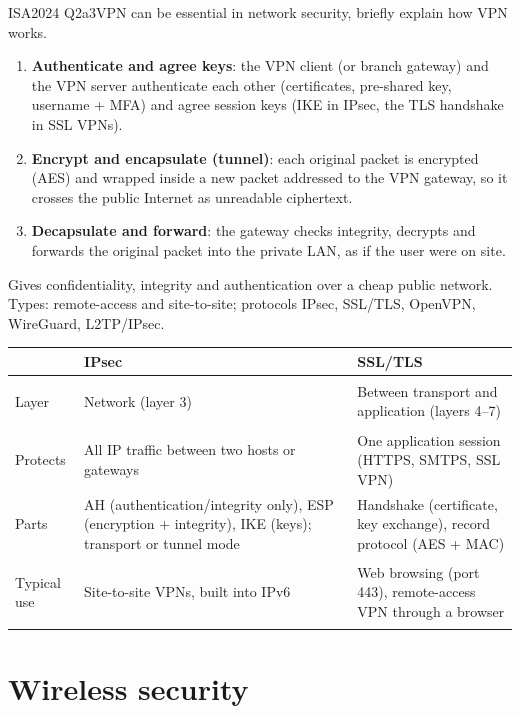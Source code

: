 \documentclass[10pt]{article}
\begin{document}
\begin{pastq}{ISA2024 Q2a}{3}VPN can be essential in network security, briefly explain how VPN works.\end{pastq}
\begin{ans}
\begin{enumerate}
\item \textbf{Authenticate and agree keys}: the VPN client (or branch gateway) and the VPN server authenticate each other (certificates, pre-shared key, username + MFA) and agree session keys (IKE in IPsec, the TLS handshake in SSL VPNs).
\item \textbf{Encrypt and encapsulate (tunnel)}: each original packet is encrypted (AES) and wrapped inside a new packet addressed to the VPN gateway, so it crosses the public Internet as unreadable ciphertext.
\item \textbf{Decapsulate and forward}: the gateway checks integrity, decrypts and forwards the original packet into the private LAN, as if the user were on site.
\end{enumerate}
Gives confidentiality, integrity and authentication over a cheap public network. Types: remote-access and site-to-site; protocols IPsec, SSL/TLS, OpenVPN, WireGuard, L2TP/IPsec.
\end{ans}

\begin{tabularx}{\linewidth}{@{}>{\bfseries\raggedright\arraybackslash}p{2.4cm}XX@{}}
\toprule
 & IPsec & SSL/TLS\\\midrule
Layer & Network (layer 3) & Between transport and application (layers 4--7)\\
Protects & All IP traffic between two hosts or gateways & One application session (HTTPS, SMTPS, SSL VPN)\\
Parts & AH (authentication/integrity only), ESP (encryption + integrity), IKE (keys); transport or tunnel mode & Handshake (certificate, key exchange), record protocol (AES + MAC)\\
Typical use & Site-to-site VPNs, built into IPv6 & Web browsing (port 443), remote-access VPN through a browser\\
\bottomrule
\end{tabularx}

\section{Wireless security}
\end{document}
